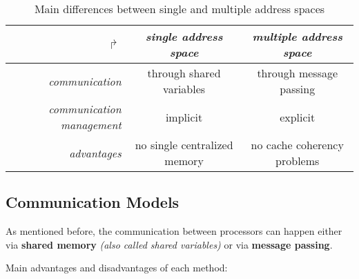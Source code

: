 \documentclass[english]{article}
\begin{document}
\begin{table}[htbp]
  \begin{tabular}{r|c|c}
    \(\Rsh\)                          & \textit{single address space} & \textit{multiple address space} \\ \hline
    \textit{communication}            & through shared variables      & through message passing         \\
    \textit{communication management} & implicit                      & explicit                        \\
    \textit{advantages}               & no single centralized memory  & no cache coherency problems
  \end{tabular}

  \caption{Main differences between single and multiple address spaces}
  \label{tab:address-spaces-differences}
\end{table}

\subsection{Communication Models}

As mentioned before, the communication between processors can happen either via \textbf{shared memory} \textit{(also called shared variables)} or via \textbf{message passing}.

Main advantages and disadvantages of each method:
\end{document}
